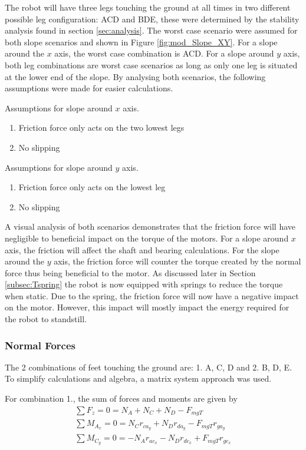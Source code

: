 The robot will have three legs touching the ground at all times in two different possible leg configuration: ACD and BDE, these were determined by the stability analysis found in section \ref{sec:analysis}. The worst case scenario were assumed for both slope scenarios and shown in Figure \ref{fig:mod_Slope_XY}. For a slope around the $x$ axis, the worst case combination is ACD. For a slope around $y$ axis, both leg combinations are worst case scenarios as long as only one leg is situated at the lower end of the slope. By analysing both scenarios, the following assumptions were made for easier calculations.

Assumptions for slope around $x$ axis.
\begin{enumerate}
  \item Friction force only acts on the two lowest legs
  \item No slipping
\end{enumerate}

Assumptions for slope around $y$ axis.
\begin{enumerate}
  \item Friction force only acts on the lowest leg 
\item No slipping
\end{enumerate}

A visual analysis of both scenarios demonstrates that the friction force will have negligible to beneficial impact on the torque of the motors. For a slope around $x$ axis, the friction will affect the shaft and bearing calculations. For the slope around the $y$ axis, the friction force will counter the torque created by the normal force thus being beneficial to the motor. As discussed later in Section \ref{subsec:Tspring} the robot is now equipped with springs to reduce the torque when static. Due to the spring, the friction force will now have a negative impact on the motor. However, this impact will mostly impact the energy required for the robot to standstill. 

\subsubsection{Normal Forces}
The 2 combinations of feet touching the ground are: 1. A, C, D and 2. B, D, E. To simplify calculations and algebra, a matrix system approach was used. 

For combination 1., the sum of forces and moments are given by
\begin{gather}
    \sum F_z = 0 = N_A + N_C + N_D - F_{mgT}
    \\
    \sum M_{A_x} = 0 = N_C r_{ca_y} + N_D r_{da_y} - F_{mgT} r_{ga_y}
    \\
    \sum M_{C_y} = 0 = -N_A r_{ac_x} -N_D r_{dc_x} + F_{mgT} r_{gc_x}
\end{gather}

